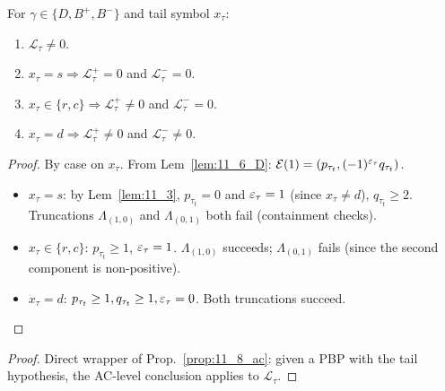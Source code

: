 \begin{proposition}
  \label{prop:11_8_ac}
  \leanok
  For $\gamma \in \{D, B^+, B^-\}$ and tail symbol $x_\tau$:
  \begin{enumerate}
    \item[(a)] $\mathcal{L}_\tau \neq 0$.
    \item[(b)] $x_\tau = s \Rightarrow \mathcal{L}_\tau^+ = 0$ and $\mathcal{L}_\tau^- = 0$.
    \item[(c)] $x_\tau \in \{r, c\} \Rightarrow \mathcal{L}_\tau^+ \neq 0$ and $\mathcal{L}_\tau^- = 0$.
    \item[(d)] $x_\tau = d \Rightarrow \mathcal{L}_\tau^+ \neq 0$ and $\mathcal{L}_\tau^- \neq 0$.
  \end{enumerate}
\end{proposition}

\begin{proof}
  \leanok
  By case on $x_\tau$. From Lem~\ref{lem:11_6_D}:
  $\mathcal{E}(1) = (p_{\tau_t}, (-1)^{\varepsilon_\tau} q_{\tau_t})$.
  \begin{itemize}
    \item $x_\tau = s$: by Lem~\ref{lem:11_3}, $p_{\tau_t} = 0$ and $\varepsilon_\tau = 1$ (since $x_\tau \neq d$), $q_{\tau_t} \geq 2$. Truncations $\Lambda_{(1, 0)}$ and $\Lambda_{(0, 1)}$ both fail (containment checks).
    \item $x_\tau \in \{r, c\}$: $p_{\tau_t} \geq 1$, $\varepsilon_\tau = 1$. $\Lambda_{(1, 0)}$ succeeds; $\Lambda_{(0, 1)}$ fails (since the second component is non-positive).
    \item $x_\tau = d$: $p_{\tau_t} \geq 1, q_{\tau_t} \geq 1, \varepsilon_\tau = 0$. Both truncations succeed.
  \end{itemize}
\end{proof}

\begin{proposition}
  \label{prop:11_8_pbp}
  \leanok
\end{proposition}
\begin{proof}
  \leanok
  Direct wrapper of Prop.~\ref{prop:11_8_ac}: given a PBP with the tail hypothesis, the AC-level conclusion applies to $\mathcal{L}_\tau$.
\end{proof}


